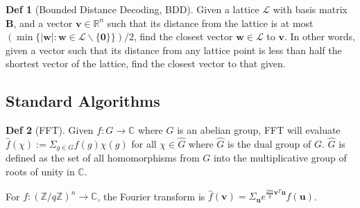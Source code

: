 \documentclass[a4paper, 10pt]{article}
\theoremstyle{definition}
\newtheorem{definition}{Def}[section]
\begin{document}
\begin{definition}[Bounded Distance Decoding, BDD]
    Given a lattice $\mathcal{L}$ with basis matrix $\textbf{B}$, and a vector $\mathbf{v} \in \mathbb{R}^n$ such that its distance from the lattice is at most $(\min\{ |\mathbf{w}| : \mathbf{w}\in \mathcal{L}\backslash \{\mathbf{0}\}\})/2$, find the closest vector $\mathbf{w}\in \mathcal{L}$ to $\mathbf{v}$. In other words, given a vector such that its distance from any lattice point is less than half the shortest vector of the lattice, find the closest vector to that given.
\end{definition}




\subsection{Standard Algorithms}

\begin{definition}[\ac{FFT}]
    Given $f:G \rightarrow \mathbb{C}$ where $G$ is an abelian group, \ac{FFT} will evaluate $\hat{f}(\chi):=\Sigma _{g \in G}f(g)\chi (g)$ for all $\chi \in \hat{G}$ where $\hat{G}$ is the dual group of $G$. $\hat{G}$ is defined as the set of all homomorphisms from $G$ into the multiplicative group of roots of unity in $\mathbb{C}$. 
    
    For $f:(\mathbb{Z}/q\mathbb{Z})^n \rightarrow \mathbb{C}$, the Fourier transform is $\hat{f}(\mathbf{v}) = \Sigma _\mathbf{u} e^{\frac{2 \pi i}{q}\mathbf{v}^T\mathbf{u}}f(\mathbf{u})$.
\end{definition}
\end{document}
